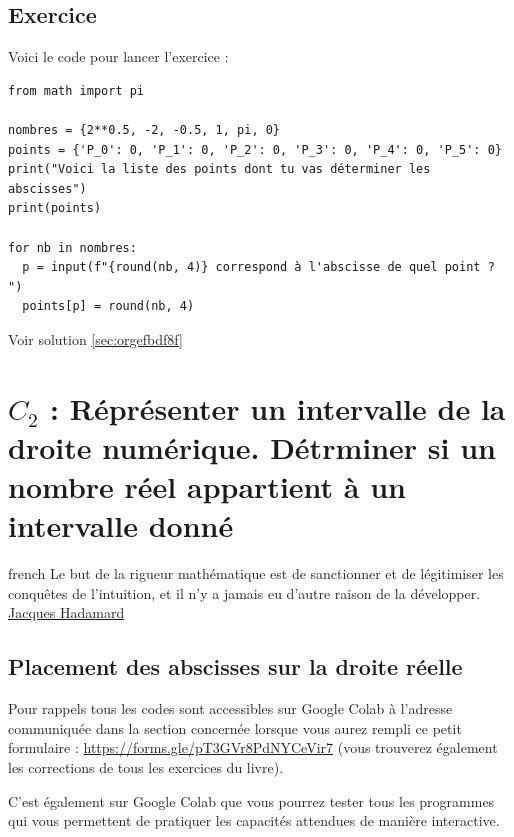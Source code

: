 \documentclass[a4paper, 11pt, twoside]{book}
\begin{document}
\section{Exercice}
\label{sec:orgc3f82e5}
Voici le code pour lancer l'exercice :

\begin{verbatim}
from math import pi

nombres = {2**0.5, -2, -0.5, 1, pi, 0}
points = {'P_0': 0, 'P_1': 0, 'P_2': 0, 'P_3': 0, 'P_4': 0, 'P_5': 0}
print("Voici la liste des points dont tu vas déterminer les abscisses")
print(points)

for nb in nombres:
  p = input(f"{round(nb, 4)} correspond à l'abscisse de quel point ? ")
  points[p] = round(nb, 4)
\end{verbatim}

Voir solution \ref{sec:orgefbdf8f}
\stopcontents[level-2]

\chapter{\(C_2\) : Réprésenter un intervalle de la droite numérique. Détrminer si un nombre réel appartient à un intervalle donné}
\label{sec:orge169269}
\startcontents[level-2]

\begin{foreigndisplayquote}{french}
Le but de la rigueur mathématique est de sanctionner et de
légitimiser les conquêtes de l'intuition, et il n'y a  jamais eu
d'autre raison de la développer.\\

\href{https://fr.wikipedia.org/wiki/Jacques\_Hadamard}{Jacques Hadamard}
\end{foreigndisplayquote}

\section{Placement des abscisses sur la droite réelle}
\label{sec:orgb0d4426}

Pour rappels tous les codes sont accessibles sur Google Colab à
l'adresse communiquée dans la section concernée lorsque vous
aurez rempli ce petit formulaire :
\url{https://forms.gle/pT3GVr8PdNYCeVir7} (vous trouverez également
les corrections de tous les exercices du livre).

C'est également sur Google Colab que vous pourrez tester tous les
programmes qui vous permettent de pratiquer les capacités attendues
de manière interactive.
\end{document}
